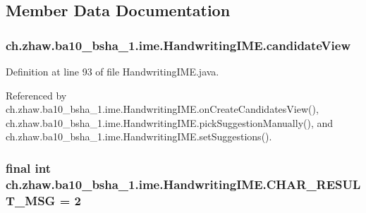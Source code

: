 \subsection{Member Data Documentation}
\hypertarget{classch_1_1zhaw_1_1ba10__bsha__1_1_1ime_1_1HandwritingIME_af7d4919c3faf26a9459310f8102d4d80}{
\subsubsection[{candidateView}]{ {\bf ch.zhaw.ba10\_\-bsha\_\-1.ime.HandwritingIME.candidateView}}}
\label{classch_1_1zhaw_1_1ba10__bsha__1_1_1ime_1_1HandwritingIME_af7d4919c3faf26a9459310f8102d4d80}


Definition at line 93 of file HandwritingIME.java.

Referenced by ch.zhaw.ba10\_\-bsha\_\-1.ime.HandwritingIME.onCreateCandidatesView(), ch.zhaw.ba10\_\-bsha\_\-1.ime.HandwritingIME.pickSuggestionManually(), and ch.zhaw.ba10\_\-bsha\_\-1.ime.HandwritingIME.setSuggestions().\hypertarget{classch_1_1zhaw_1_1ba10__bsha__1_1_1ime_1_1HandwritingIME_a4a5e59ff77bc147c35c6cc423e878305}{
\subsubsection[{CHAR\_\-RESULT\_\-MSG}]{\setlength{\rightskip}{0pt plus 5cm}final int {\bf ch.zhaw.ba10\_\-bsha\_\-1.ime.HandwritingIME.CHAR\_\-RESULT\_\-MSG} = 2}}
\label{classch_1_1zhaw_1_1ba10__bsha__1_1_1ime_1_1HandwritingIME_a4a5e59ff77bc147c35c6cc423e878305}


